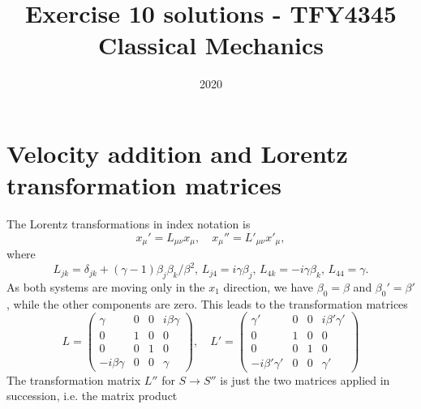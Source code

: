 \documentclass{article}
\title{Exercise 10 solutions - TFY4345 Classical Mechanics}
\date{2020}
\begin{document}
    \maketitle
    \section{Velocity addition and Lorentz transformation matrices}
        The Lorentz transformations in index notation is
        \begin{equation*}
            x_\mu' = L_{\mu\nu}x_\mu, \quad x_\mu'' = L'_{\mu\nu}x'_\mu,
        \end{equation*}
        where
        \begin{equation*}
            L_{jk} = \delta_{jk} + (\gamma - 1) \beta_j\beta_k/\beta^2, \, L_{j4}=i\gamma \beta_j, \, L_{4k} = - i \gamma \beta_k, \, L_{44} = \gamma.
        \end{equation*}
        As both systems are moving only in the $x_1$ direction, we have $\beta_0 = \beta$ and $\beta_0' = \beta'$, while the other components are zero. This leads to the transformation matrices
        \begin{equation*}
            L = 
            \begin{pmatrix*}
                \gamma & 0 & 0 & i \beta \gamma \\
                0 & 1 &  0 & 0 \\
                0 & 0 & 1 & 0 \\
                -i\beta \gamma & 0 & 0 & \gamma
            \end{pmatrix*}
            , \quad L'=
            \begin{pmatrix*}
                \gamma' & 0 & 0 & i \beta' \gamma' \\
                0 & 1 &  0 & 0 \\
                0 & 0 & 1 & 0 \\
                -i\beta' \gamma' & 0 & 0 & \gamma'
            \end{pmatrix*}
        \end{equation*} 
        The transformation matrix $L''$ for $S \rightarrow S''$ is just the two matrices applied in succession, i.e. the matrix product
\end{document}
